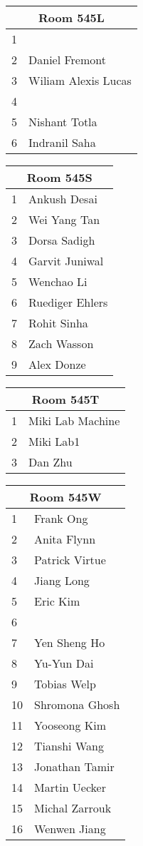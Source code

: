 \documentclass{article}
\begin{document}
\noindent
\begin{tabular}{|l|l|}
\hline
\multicolumn{2}{|c|}{Room 545L} \\ \hline\hline
1& \\
2&Daniel Fremont\\
3&Wiliam Alexis Lucas\\
4& \\
5&Nishant Totla\\
6&Indranil Saha\\

\hline
\end{tabular}
\vspace{1in}

\noindent
\begin{tabular}{|l|l|}
\hline
\multicolumn{2}{|c|}{Room 545S} \\ \hline\hline
1&Ankush Desai\\
2&Wei Yang Tan\\
3&Dorsa Sadigh\\
4&Garvit Juniwal\\
5&Wenchao Li\\
6&Ruediger Ehlers\\
7&Rohit Sinha\\
8&Zach Wasson\\
9&Alex Donze\\

\hline
\end{tabular}
\vspace{1in}

\noindent
\begin{tabular}{|l|l|}
\hline
\multicolumn{2}{|c|}{Room 545T} \\ \hline\hline
1&Miki Lab Machine\\
2&Miki Lab1\\
3&Dan Zhu\\

\hline
\end{tabular}
\vspace{1in}

\noindent
\begin{tabular}{|l|l|}
\hline
\multicolumn{2}{|c|}{Room 545W} \\ \hline\hline
1&Frank Ong\\
2&Anita Flynn\\
3&Patrick Virtue\\
4&Jiang Long\\
5&Eric Kim\\
6& \\
7&Yen Sheng Ho\\
8&Yu-Yun Dai\\
9&Tobias Welp\\
10&Shromona Ghosh\\
11&Yooseong Kim\\
12&Tianshi Wang\\
13&Jonathan Tamir\\
14&Martin Uecker\\
15&Michal Zarrouk\\
16&Wenwen Jiang\\

\hline
\end{tabular}
\end{document}
